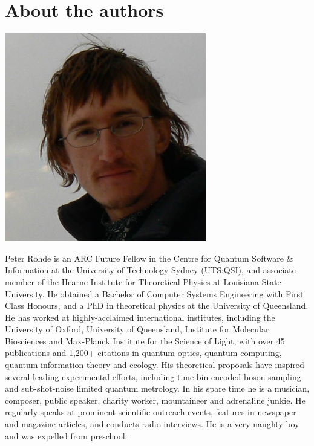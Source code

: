 %
%

\section*{About the authors}






\includegraphics[width=\columnwidth]{photo_peter_rohde}

Peter Rohde is an ARC Future Fellow in the Centre for Quantum Software \& Information at the University of Technology Sydney (UTS:QSI), and associate member of the Hearne Institute for Theoretical Physics at Louisiana State University. He obtained a Bachelor of Computer Systems Engineering with First Class Honours, and a PhD in theoretical physics at the University of Queensland. He has worked at highly-acclaimed international institutes, including the University of Oxford, University of Queensland, Institute for Molecular Biosciences and Max-Planck Institute for the Science of Light, with over 45 publications and 1,200+ citations in quantum optics, quantum computing, quantum information theory and ecology. His theoretical proposals have inspired several leading experimental efforts, including time-bin encoded boson-sampling and sub-shot-noise limited quantum metrology. In his spare time he is a musician, composer, public speaker, charity worker, mountaineer and adrenaline junkie. He regularly speaks at prominent scientific outreach events, features in newspaper and magazine articles, and conducts radio interviews. He is a very naughty boy and was expelled from preschool.

